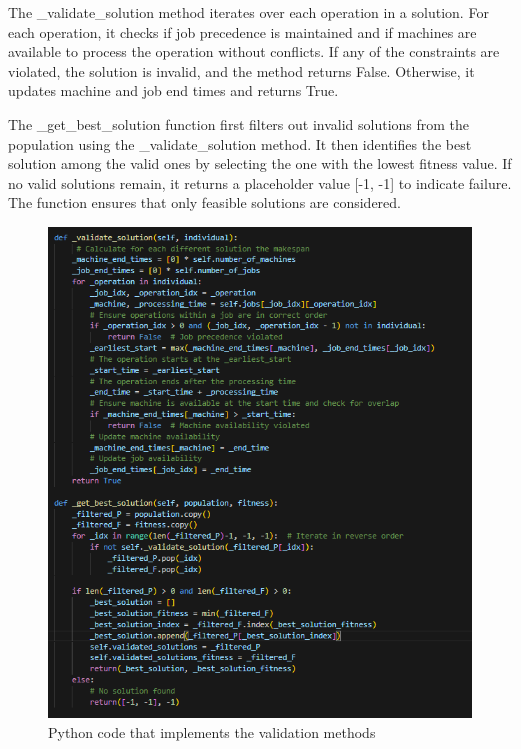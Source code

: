 \documentclass[11pt, a4paper]{article}
\begin{document}
\vspace{1em} The \_validate\_solution method iterates over each operation in a solution. For each operation, it checks if job precedence is maintained and if machines are available 
to process the operation without conflicts. If any of the constraints are violated, the solution is invalid, and the method returns False. Otherwise, it updates machine and job end 
times and returns True.

\vspace{1em}The \_get\_best\_solution function first filters out invalid solutions from the population using the \_validate\_solution method. It then identifies the best solution among 
the valid ones by selecting the one with the lowest fitness value. If no valid solutions remain, it returns a placeholder value [-1, -1] to indicate failure. The function ensures that 
only feasible solutions are considered.

\begin{figure}[H]
    \centering
    \includegraphics[width=\textwidth]{media/validate_solution.png}
    \caption{Python code that implements the validation methods}
    \label{fig:image_12}
\end{figure}
\end{document}
